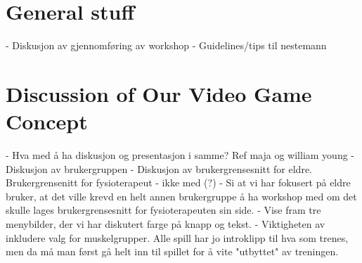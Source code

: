 \section{General stuff}
- Diskusjon av gjennomføring av workshop
- Guidelines/tips til nestemann

\section{Discussion of Our Video Game Concept}
- Hva med å ha diskusjon og presentasjon i samme? Ref maja og william young
- Diskusjon av brukergruppen
- Diskusjon av brukergrensesnitt for eldre. Brukergrensenitt for fysioterapeut - ikke med (?)
- Si at vi har fokusert på eldre bruker, at det ville krevd en helt annen brukergruppe å ha workshop med om det skulle lages brukergrensesnitt for fysioterapeuten sin side.
- Vise fram tre menybilder, der vi har diskutert farge på knapp og tekst. 
- Viktigheten av inkludere valg for muskelgrupper. Alle spill har jo introklipp til hva som trenes, men da må man først gå helt inn til spillet for å vite "utbyttet" av treningen.
